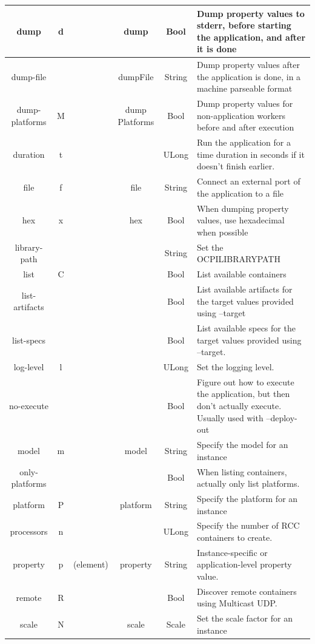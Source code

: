 \documentclass[10pt, a4paper, oneside]{article}
\renewcommand\_{\textunderscore\allowbreak} %
\begin{document}
\begin{longtable} {| c| c| c |c|c|p{5cm}|}
\hline 
dump &	d &	{} & dump & Bool & Dump property values to stderr, before starting the application, and after it is done\\ 
\hline 
dump-file & {} & {} & dumpFile & String & Dump property values after the application is done, in a machine parseable format\\ 
\hline  
dump-platforms & M	& {}	& dump 
Platforms & Bool &	Dump property values for non-application workers before and after execution\\ 
\hline 
duration &	t & {} &{} & ULong & Run the application for a time duration in seconds if it doesn't finish earlier.\\ 
\hline 
file &	f	& {} &	file & 	String	& Connect an external port of the application to a file\\ 
\hline
hex & x	& {} & 	hex	& Bool	& When dumping property values, use hexadecimal when possible\\ 
\hline 
library-path & {} & {} &{} & String & Set the OCPI\_LIBRARY\_PATH\\
\hline
list&C&{}&{}&Bool&List available containers\\
\hline
list-artifacts&{}&{}&{}&Bool&List available artifacts for the target values provided using --target\\
\hline 
list-specs&{}&{}&{}&Bool&List available specs for the target values provided using --target.\\
\hline 
log-level & l&{}&{}&ULong & Set the logging level.\\
\hline
no-execute&{}&{}&{}&Bool&Figure out how to execute the application, but then don't actually execute.  Usually used with --deploy-out\\
\hline
model & m & {} & model & String & Specify the model for an instance\\
\hline
only-platforms & {} & {} & {} & Bool & When listing containers, actually only list platforms.\\
\hline
platform & P & {} & platform & String & Specify the platform for an instance\\
\hline
processors & n & {} & {} & ULong&Specify the number of RCC containers to create.\\
\hline
property & p & (element) & property & String & Instance-specific or application-level property value.\\
\hline
remote & R & {} & {}& Bool&Discover remote containers using Multicast UDP.\\
\hline
scale & N & {} & scale & Scale & Set the scale factor for an instance\\

\end{longtable}
\end{document}
